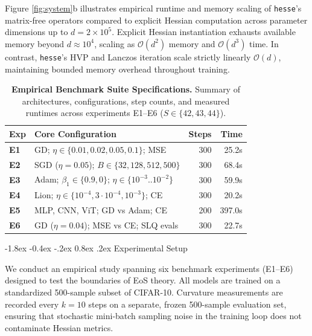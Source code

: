 \documentclass[10pt,twocolumn]{article}
\makeatletter
\renewcommand\section{\@startsection {section}{1}{\z@}%
                                   {-1.8ex \@plus -0.4ex \@minus -.2ex}%
                                   {0.8ex \@plus .2ex}%
                                   {\normalfont\large\bfseries}}
\makeatother
\begin{document}
Figure \ref{fig:system}b illustrates empirical runtime and memory scaling of \texttt{hesse}'s matrix-free operators compared to explicit Hessian computation across parameter dimensions up to $d = 2 \times 10^5$. Explicit Hessian instantiation exhausts available memory beyond $d \approx 10^4$, scaling as $\mathcal{O}(d^2)$ memory and $\mathcal{O}(d^3)$ time. In contrast, \texttt{hesse}'s HVP and Lanczos iteration scale strictly linearly $\mathcal{O}(d)$, maintaining bounded memory overhead throughout training.

\begin{table}[t]
\centering
\small
\setlength{\tabcolsep}{3.5pt}
\caption{\textbf{Empirical Benchmark Suite Specifications.} Summary of architectures, configurations, step counts, and measured runtimes across experiments E1--E6 ($S \in \{42, 43, 44\}$).}
\label{tab:benchmarks}
\begin{tabularx}{\columnwidth}{lXrr}
\toprule
\textbf{Exp} & \textbf{Core Configuration} & \textbf{Steps} & \textbf{Time} \\
\midrule
\textbf{E1} & GD; $\eta \in \{0.01, 0.02, 0.05, 0.1\}$; MSE & 300 & 25.2s \\
\textbf{E2} & SGD ($\eta=0.05$); $B \in \{32, 128, 512, 500\}$ & 300 & 68.4s \\
\textbf{E3} & Adam; $\beta_1 \in \{0.9, 0\}$; $\eta \in \{10^{-3}..10^{-2}\}$ & 300 & 59.9s \\
\textbf{E4} & Lion; $\eta \in \{10^{-4}, 3\cdot 10^{-4}, 10^{-3}\}$; CE & 300 & 20.2s \\
\textbf{E5} & MLP, CNN, ViT; GD vs Adam; CE & 200 & 397.0s \\
\textbf{E6} & GD ($\eta=0.04$); MSE vs CE; SLQ evals & 300 & 22.7s \\
\bottomrule
\end{tabularx}
\end{table}

\section{Experimental Setup}

We conduct an empirical study spanning six benchmark experiments (E1--E6) designed to test the boundaries of EoS theory. All models are trained on a standardized 500-sample subset of CIFAR-10. Curvature measurements are recorded every $k=10$ steps on a separate, frozen 500-sample evaluation set, ensuring that stochastic mini-batch sampling noise in the training loop does not contaminate Hessian metrics.
\end{document}
